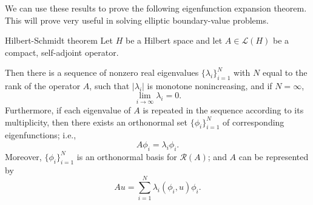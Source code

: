 We can use these results to prove the following eigenfunction expansion theorem. This will prove very useful in solving elliptic boundary-value problems.

\begin{Theorem}{Hilbert-Schmidt theorem}
\label{thm:hilbert-schmidt-spectral}
Let $H$ be a Hilbert space and let $A\in\mathcal{L}(H)$ be a compact, self-adjoint operator.

Then there is a sequence of nonzero real eigenvalues $\{\lambda_i\}_{i=1}^N$ with $N$ equal to the rank of the operator $A$, such that $|\lambda_i|$ is monotone nonincreasing, and if $N=\infty$,
\begin{equation}\label{eq:compact-self-adjoint-nonzero-eigenvalue-limit}
\lim_{i\to\infty}\lambda_i=0.
\end{equation}
Furthermore, if each eigenvalue of $A$ is repeated in the sequence according to its multiplicity, then there exists an orthonormal set $\{\phi_i\}_{i=1}^N$ of corresponding eigenfunctions; i.e.,
\begin{equation}\label{eq:compact-self-adjoint-eigenfunction-equations}
A\phi_i=\lambda_i\phi_i.
\end{equation}
Moreover, $\{\phi_i\}_{i=1}^N$ is an orthonormal basis for $\mathcal{R}(A)$; and $A$ can be represented by
\begin{equation}\label{eq:hilbert-schmidt-operator-eigenfunction-expansion}
Au=\sum_{i=1}^N\lambda_i(\phi_i,u)\phi_i.
\end{equation}

\end{Theorem}

